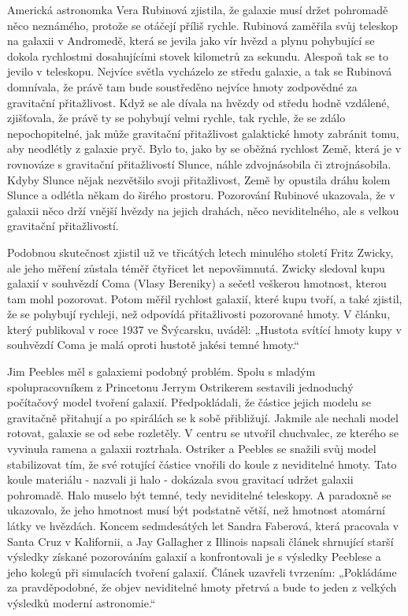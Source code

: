   Americká astronomka Vera Rubinová zjistila, že galaxie musí držet pohromadě něco neznámého,
  protože se otáčejí příliš rychle. Rubinová zaměřila svůj teleskop na galaxii v Andromedě, která se
  jevila jako vír hvězd a plynu pohybující se dokola rychlostmi dosahujícími stovek kilometrů za
  sekundu. Alespoň tak se to jevilo v teleskopu. Nejvíce světla vycházelo ze středu galaxie, a tak
  se Rubinová domnívala, že právě tam bude soustředěno nejvíce hmoty zodpovědné za gravitační
  přitažlivost. Když se ale dívala na hvězdy od středu hodně vzdálené, zjišťovala, že právě ty se
  pohybují velmi rychle, tak rychle, že se zdálo nepochopitelné, jak může gravitační přitažlivost
  galaktické hmoty zabránit tomu, aby neodlétly z galaxie pryč. Bylo to, jako by se oběžná rychlost
  Země, která je v rovnováze s gravitační přitažlivostí Slunce, náhle zdvojnásobila či
  ztrojnásobila. Kdyby Slunce nějak nezvětšilo svoji přitažlivost, Země by opustila dráhu kolem
  Slunce a odlétla někam do širého prostoru. Pozorování Rubinové ukazovala, že v galaxii něco drží
  vnější hvězdy na jejich drahách, něco neviditelného, ale s velkou gravitační přitažlivostí.
  
  Podobnou skutečnost zjistil už ve třicátých letech minulého století Fritz Zwicky, ale jeho měření
  zůstala téměř čtyřicet let nepovšimnutá. Zwicky sledoval kupu galaxií v souhvězdí Coma (Vlasy
  Bereniky) a sečetl veškerou hmotnost, kterou tam mohl pozorovat. Potom měřil rychlost galaxií,
  které kupu tvoří, a také zjistil, že se pohybují rychleji, než odpovídá přitažlivosti pozorované
  hmoty. V článku, který publikoval v roce 1937 ve Švýcarsku, uváděl: „Hustota svítící hmoty kupy v
  souhvězdí Coma je malá oproti hustotě jakési temné hmoty.“
  
  Jim Peebles měl s galaxiemi podobný problém. Spolu s mladým spolupracovníkem z Princetonu Jerrym
  Ostrikerem sestavili jednoduchý počítačový model tvoření galaxií. Předpokládali, že částice jejich
  modelu se gravitačně přitahují a po spirálách se k sobě přibližují. Jakmile ale nechali model
  rotovat, galaxie se od sebe rozletěly. V centru se utvořil chuchvalec, ze kterého se vyvinula
  ramena a galaxii roztrhala. Ostriker a Peebles se snažili svůj model stabilizovat tím, že své
  rotující částice vnořili do koule z neviditelné hmoty. Tato koule materiálu - nazvali ji halo -
  dokázala svou gravitací udržet galaxii pohromadě. Halo muselo být temné, tedy neviditelné
  teleskopy. A paradoxně se ukazovalo, že jeho hmotnost musí být podstatně větší, než hmotnost
  atomární látky ve hvězdách. Koncem sedmdesátých let Sandra Faberová, která pracovala v Santa Cruz
  v Kalifornii, a Jay Gallagher z Illinois napsali článek shrnující starší výsledky získané
  pozorováním galaxií a konfrontovali je s výsledky Peeblese a jeho kolegů při simulacích tvoření
  galaxií. Článek uzavřeli tvrzením: „Pokládáme za pravděpodobné, že objev neviditelné hmoty přetrvá
  a bude to jeden z velkých výsledků moderní astronomie.“
  
